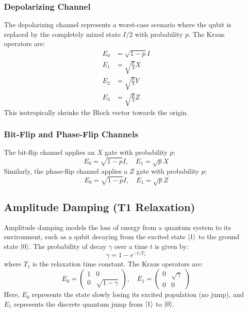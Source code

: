 \documentclass[11pt, a4paper]{article}
\begin{document}
\subsubsection{Depolarizing Channel}
The depolarizing channel represents a worst-case scenario where the qubit is replaced by the completely mixed state $I/2$ with probability $p$. The Kraus operators are:
\begin{align}
    E_0 &= \sqrt{1 - p} I \\
    E_1 &= \sqrt{\frac{p}{3}} X \\
    E_2 &= \sqrt{\frac{p}{3}} Y \\
    E_3 &= \sqrt{\frac{p}{3}} Z
\end{align}
This isotropically shrinks the Bloch vector towards the origin.

\subsubsection{Bit-Flip and Phase-Flip Channels}
The bit-flip channel applies an $X$ gate with probability $p$:
\begin{equation}
    E_0 = \sqrt{1-p} I, \quad E_1 = \sqrt{p} X
\end{equation}
Similarly, the phase-flip channel applies a $Z$ gate with probability $p$:
\begin{equation}
    E_0 = \sqrt{1-p} I, \quad E_1 = \sqrt{p} Z
\end{equation}

\subsection{Amplitude Damping (T1 Relaxation)}
Amplitude damping models the loss of energy from a quantum system to its environment, such as a qubit decaying from the excited state $\ket{1}$ to the ground state $\ket{0}$. The probability of decay $\gamma$ over a time $t$ is given by:
\begin{equation}
    \gamma = 1 - e^{-t / T_1}
\end{equation}
where $T_1$ is the relaxation time constant. The Kraus operators are:
\begin{equation}
    E_0 = \begin{pmatrix} 1 & 0 \\ 0 & \sqrt{1-\gamma} \end{pmatrix}, \quad 
    E_1 = \begin{pmatrix} 0 & \sqrt{\gamma} \\ 0 & 0 \end{pmatrix}
\end{equation}
Here, $E_0$ represents the state slowly losing its excited population (no jump), and $E_1$ represents the discrete quantum jump from $\ket{1}$ to $\ket{0}$.
\end{document}
